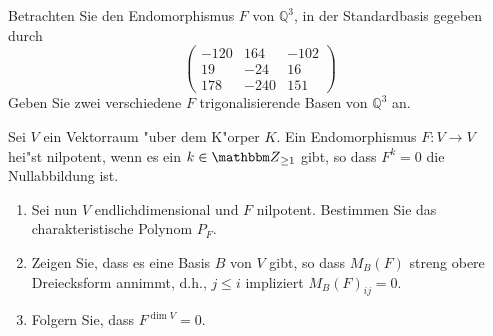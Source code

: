 \documentclass[a4,11pt]{article}
\begin{document}
\vspace*{-17mm}
{
\kopf
}


\begin{aufgabe}[4 Punkte]
  Betrachten Sie den Endomorphismus $F$ von $\mathbb{Q}^3$, in der Standardbasis gegeben durch
  \[
  \begin{pmatrix}
  -120 & 164 & -102\\
 19 & -24 & 16\\
 178 & -240 & 151
  \end{pmatrix}
  \]
  Geben Sie zwei verschiedene $F$ trigonalisierende Basen von $\mathbb{Q}^3$ an.
\end{aufgabe}

\begin{aufgabe}[4 Punkte]
  Sei $V$ ein Vektorraum "uber dem K"orper
  $K$. Ein Endomorphismus $F \colon V \to V$ hei"st nilpotent, wenn es
  ein $k \in \Z_{\ge 1}$ gibt, so dass $F^k=0$ die Nullabbildung ist.

\begin{enumerate}
\item Sei nun $V$ endlichdimensional und $F$ nilpotent. Bestimmen Sie
  das charakteristische Polynom $P_F$.
\item Zeigen Sie, dass es eine Basis $B$ von $V$ gibt, so dass
  $M_B(F)$ streng obere Dreiecksform annimmt, d.h., $j \leq i$ impliziert $M_B(F)_{ij} = 0$.
\item Folgern Sie, dass $F^{\dim V} = 0$.
\end{enumerate}

\end{aufgabe}


\end{document}
